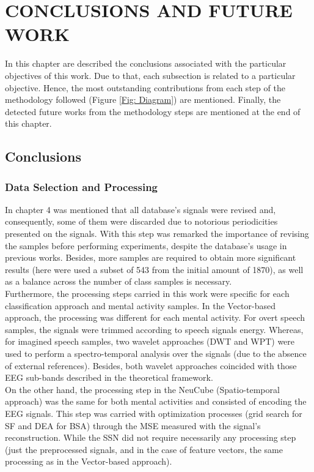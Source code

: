 \chapter[CONCLUSIONS AND FUTURE WORK]{\huge CONCLUSIONS AND FUTURE WORK}
In this chapter are described the conclusions associated with the particular objectives of this work. Due to that, each subsection is related to a particular objective. Hence, the most outstanding contributions from each step of the methodology followed (Figure \ref{Fig: Diagram}) are mentioned. Finally, the detected future works from the methodology steps are mentioned at the end of this chapter.

\section{Conclusions}
\subsection{Data Selection and Processing}
In chapter 4 was mentioned that all database's signals were revised and, consequently, some of them were discarded due to notorious periodicities presented on the signals. With this step was remarked the importance of revising the samples before performing experiments, despite the database's usage in previous works. Besides, more samples are required to obtain more significant results (here were used a subset of 543 from the initial amount of 1870), as well as a balance across the number of class samples is necessary.\\

Furthermore, the processing steps carried in this work were specific for each classification approach and mental activity samples. In the Vector-based approach, the processing was different for each mental activity. For overt speech samples, the signals were trimmed according to speech signals energy. Whereas, for imagined speech samples, two wavelet approaches (DWT and WPT) were used to perform a spectro-temporal analysis over the signals (due to the absence of external references). Besides, both wavelet approaches coincided with those EEG sub-bands described in the theoretical framework.\\

On the other hand, the processing step in the NeuCube (Spatio-temporal approach) was the same for both mental activities and consisted of encoding the EEG signals. This step was carried with optimization processes (grid search for SF and DEA for BSA) through the MSE measured with the signal's reconstruction. While the SSN did not require necessarily any processing step (just the preprocessed signals, and in the case of feature vectors, the same processing as in the Vector-based approach).\\

